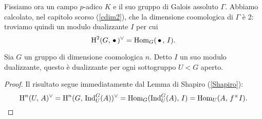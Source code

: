 Fissiamo ora un campo $ p $-adico $ K $ e il suo gruppo di Galois assoluto $ \Gamma $. Abbiamo calcolato, nel capitolo scorso (\ref{cdim2}), che la dimensione coomologica di $ \Gamma $ è 2: troviamo quindi un modulo dualizzante $ I $ per cui 
\[ \operatorname{H}^2(G, \, \bullet \, )^\vee = \operatorname{Hom}_G(\,\bullet\, , \, I). \]




\begin{lemma}
	Sia $ G $ un gruppo di dimensione coomologica $ n $. Detto $ I $ un suo modulo dualizzante, questo è dualizzante per ogni sottogruppo $ U < G $ aperto.
\end{lemma}
\begin{proof}
	Il risultato segue immediatamente dal Lemma di Shapiro (\ref{Shapiro}):
	\[ \operatorname{H}^n(U, \, A)^\vee = \operatorname{H}^n(G, \, \operatorname{Ind}_U^G(A))^\vee = \operatorname{Hom}_G(\operatorname{Ind}_U^G(A), \, I) = \operatorname{Hom}_U(A, \, f^\times I). \qedhere \]
\end{proof}


